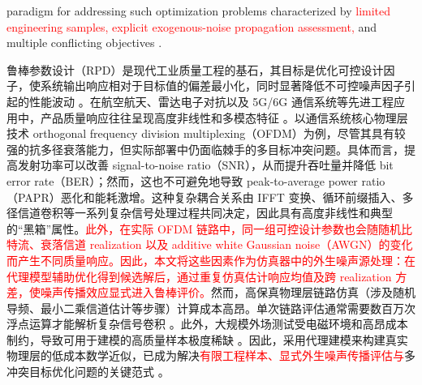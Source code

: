 \documentclass[11pt]{article}
\begin{document}
paradigm for addressing such optimization problems characterized by \textcolor{red}{limited engineering samples, explicit exogenous-noise propagation assessment,} and multiple conflicting objectives \citep{Luo2022, LiY2025}.

鲁棒参数设计（RPD）是现代工业质量工程的基石，其目标是优化可控设计因子，使系统输出响应相对于目标值的偏差最小化，同时显著降低不可控噪声因子引起的性能波动 \citep{Taguchi1986, Joseph2006, Montgomery2017, Hamada2021}。在航空航天、雷达电子对抗以及 5G/6G 通信系统等先进工程应用中，产品质量响应往往呈现高度非线性和多模态特征 \citep{Wang2020, Liu2025, Gnanasambandam2025, SongJ2025}。以通信系统核心物理层技术 orthogonal frequency division multiplexing（OFDM）为例，尽管其具有较强的抗多径衰落能力，但实际部署中仍面临棘手的多目标冲突问题。具体而言，提高发射功率可以改善 signal-to-noise ratio（SNR），从而提升吞吐量并降低 bit error rate（BER）；然而，这也不可避免地导致 peak-to-average power ratio（PAPR）恶化和能耗激增。这种复杂耦合关系由 IFFT 变换、循环前缀插入、多径信道卷积等一系列复杂信号处理过程共同决定，因此具有高度非线性和典型的“黑箱”属性。\textcolor{red}{此外，在实际 OFDM 链路中，同一组可控设计参数也会随随机比特流、衰落信道 realization 以及 additive white Gaussian noise（AWGN）的变化而产生不同质量响应。因此，本文将这些因素作为仿真器中的外生噪声源处理：在代理模型辅助优化得到候选解后，通过重复仿真估计响应均值及跨 realization 方差，使噪声传播效应显式进入鲁棒评价。}然而，高保真物理层链路仿真（涉及随机导频、最小二乘信道估计等步骤）计算成本高昂。单次链路评估通常需要数百万次浮点运算才能解析复杂信号卷积 \citep{Song2025}。此外，大规模外场测试受电磁环境和高昂成本制约，导致可用于建模的高质量样本极度稀缺 \citep{Ming2022, Sauer2022, Ghandwani2025}。因此，采用代理建模来构建真实物理层的低成本数学近似，已成为解决\textcolor{red}{有限工程样本、显式外生噪声传播评估与}多冲突目标优化问题的关键范式 \citep{Luo2022, LiY2025}。
\end{document}
